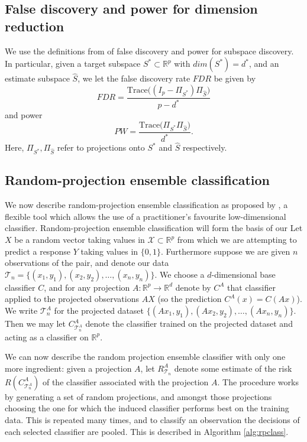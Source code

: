 \documentclass[12pt]{article}
\begin{document}
\subsection{False discovery and power for dimension reduction}
We use the definitions from \citet{taeb_false_2020} of false discovery and power for subspace discovery. In particular, given a target subspace $S^* \subset \mathbb{R}^p$ with $dim(S^*) = d^*$, and an estimate subspace $\hat{S}$, we let the false discovery rate $FDR$ be given by 
\[FDR = \frac{\mathrm{Trace} \big( (I_p - \Pi_{S^*})\Pi_{\hat{S}} \big)}{p - d^*} \]
and power
\[PW = \frac{\mathrm{Trace} \big( \Pi_{S^*} \Pi_{\hat{S}} \big)}{d^*}. \]
Here, $\Pi_{S^*}, \Pi_{\hat{S}}$ refer to projections onto $S^*$ and $\hat{S}$ respectively. 
\subsection{Random-projection ensemble classification}
We now describe random-projection ensemble classification as proposed by \citet{cannings_random-projection_2017}, a flexible tool which allows the use of a practitioner's favourite low-dimensional classifier. Random-projection ensemble classification will form the basis of our Let $X$ be a random vector taking values in $\mathcal{X} \subset \mathbb{R}^p$ from which we are attempting to predict a response $Y$ taking values in $\{0,1\}$. Furthermore suppose we are given $n$ observations of the pair, and denote our data $\mathcal{T}_n = \{(x_1, y_1), (x_2, y_2), \dots, (x_n, y_n)\}$. We choose a $d$-dimensional base classifier $C$, and for any projection $A:\mathbb{R}^p \rightarrow \mathbb{R}^d$ denote by $C^A$ that classifier applied to the projected observations $AX$ (so the prediction $C^A(x) = C(Ax)$). We write $\mathcal{T}_n^A$ for the projected dataset $\{(Ax_1, y_1), (Ax_2, y_2), \dots, (Ax_n, y_n)\}$. Then we may let $C^A_{\mathcal{T}_n^A}$ denote the classifier trained on the projected dataset and acting as a classifier on $\mathbb{R}^p$. 

We can now describe the random projection ensemble classifier with only one more ingredient: given a projection $A$, let $R^A_{\mathcal{T}_n}$ denote some estimate of the risk $R(C^A_{\mathcal{T}_n^A})$ of the classifier associated with the projection $A$. The procedure works by generating a set of random projections, and amongst those projections choosing the one for which the induced classifier performs best on the training data. This is repeated many times, and to classify an observation the decisions of each selected classifier are pooled. This is described in Algorithm \ref{alg:rpclass}.
\end{document}
